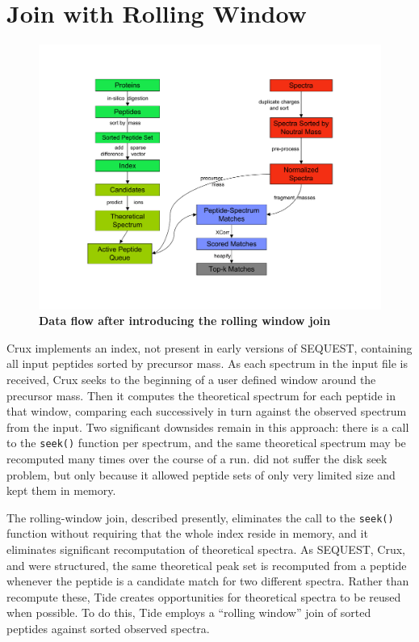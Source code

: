 \section{Join with Rolling Window \label{section:join}}

\begin{figure}
\centering
\includegraphics[width=6.0in]{Diagrams_p2-p2-cropped.pdf}
\caption[Data flow after introducing the rolling window join]{{\bf Data flow
    after introducing the rolling window join}
  \label{figure:join}}
\end{figure}

Crux implements an index, not present in early versions of SEQUEST,
containing all input peptides sorted by precursor mass. As each
spectrum in the input file is received, Crux seeks to the beginning of
a user defined window around the precursor mass. Then it computes the
theoretical spectrum for each peptide in that window, comparing each
successively in turn against the observed spectrum from the input. Two
significant downsides remain in this approach: there is a call to the
{\tt seek()} function 
per spectrum, and the same theoretical spectrum may be recomputed many
times over the course of a run. \tidezero did not suffer the disk seek
problem, but only because it allowed peptide sets of only very limited
size and kept them in memory.

The rolling-window join, described presently, eliminates the call to 
the {\tt seek()} function
without requiring that the whole index reside in memory, and it
eliminates significant recomputation of theoretical spectra. As
SEQUEST, Crux, and \tidezero were structured, the same theoretical
peak set is recomputed from a peptide whenever the peptide is a
candidate match for two different spectra. Rather than recompute
these, Tide creates opportunities for theoretical spectra to be reused
when possible.  To do this, Tide employs a ``rolling window'' join of
sorted peptides against sorted observed spectra.

